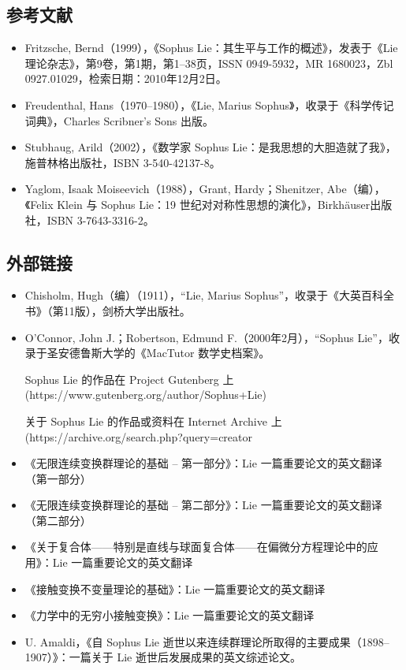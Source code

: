 \subsection{参考文献}
\begin{itemize}
\item Fritzsche, Bernd（1999），《Sophus Lie：其生平与工作的概述》，发表于《Lie理论杂志》，第9卷，第1期，第1–38页，ISSN 0949-5932，MR 1680023，Zbl 0927.01029，检索日期：2010年12月2日。
\item Freudenthal, Hans（1970–1980），《Lie, Marius Sophus》，收录于《科学传记词典》，Charles Scribner’s Sons 出版。
\item Stubhaug, Arild（2002），《数学家 Sophus Lie：是我思想的大胆造就了我》，施普林格出版社，ISBN 3-540-42137-8。
\item Yaglom, Isaak Moiseevich（1988），Grant, Hardy；Shenitzer, Abe（编），《Felix Klein 与 Sophus Lie：19 世纪对对称性思想的演化》，Birkhäuser出版社，ISBN 3-7643-3316-2。
\end{itemize}
\subsection{外部链接}
\begin{itemize}
\item Chisholm, Hugh（编）（1911），“Lie, Marius Sophus”，收录于《大英百科全书》（第11版），剑桥大学出版社。
\item O'Connor, John J.；Robertson, Edmund F.（2000年2月），“Sophus Lie”，收录于圣安德鲁斯大学的《MacTutor 数学史档案》。
\item [Sophus Lie 的作品在 Project Gutenberg 上](https://www.gutenberg.org/author/Sophus+Lie)
\item [关于 Sophus Lie 的作品或资料在 Internet Archive 上](https://archive.org/search.php?query=creator%
\item 《无限连续变换群理论的基础 – 第一部分》：Lie 一篇重要论文的英文翻译（第一部分）
\item 《无限连续变换群理论的基础 – 第二部分》：Lie 一篇重要论文的英文翻译（第二部分）
\item 《关于复合体——特别是直线与球面复合体——在偏微分方程理论中的应用》：Lie 一篇重要论文的英文翻译
\item 《接触变换不变量理论的基础》：Lie 一篇重要论文的英文翻译
\item 《力学中的无穷小接触变换》：Lie 一篇重要论文的英文翻译
\item U. Amaldi，《自 Sophus Lie 逝世以来连续群理论所取得的主要成果（1898–1907）》：一篇关于 Lie 逝世后发展成果的英文综述论文。
\end{itemize}
